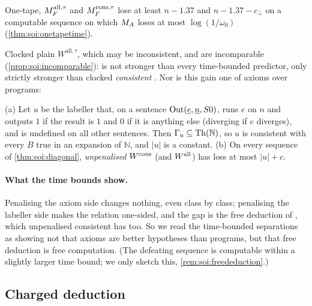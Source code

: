 One-tape, $M_{F}^{\mathrm{all},\tau}$ and $M_{F}^{\mathrm{cons},\tau}$ lose at least $n-1.37$ and $n-1.37-c_\bot$ on a computable sequence on which $M_{A}$ loses at most $\log(1/\omega_0)$ (\cref{thm:soi:onetapetime}).

Clocked plain $W^{\mathrm{all},\tau}$, which may be inconsistent, and \SAIabbr are incomparable (\cref{prop:soi:incomparable}): \SAIabbr is not stronger than every time-bounded predictor, only strictly stronger than clocked \emph{consistent} \SOIabbr. Nor is this gain one of axioms over programs:

\begin{proposition}\label{prop:soi:freededuction}
(a) Let $u$ be the labeller that, on a sentence $\mathrm{Out}(\underline{e},\underline{n},S0)$, runs $e$ on $n$ and outputs $1$ if the result is $1$ and $0$ if it is anything else (diverging if $e$ diverges), and is undefined on all other sentences. Then $\Gamma_u\subseteq\mathrm{Th}(\mathbb N)$, so $u$ is consistent with every $B$ true in an expansion of $\mathbb N$, and $\lvert u\rvert$ is a constant.
(b) On every sequence of \cref{thm:soi:diagonal}, \emph{unpenalised} $W^{\mathrm{cons}}$ (and $W^{\mathrm{all}}$) has loss at most $\lvert u\rvert+c$.
\end{proposition}

\paragraph{What the time bounds show.}\label{rem:soi:timereading} Penalising the axiom side changes nothing, even class by class; penalising the labeller side makes the relation one-sided, and the gap is the free deduction of \SAIabbr, which unpenalised consistent \SOIabbr has too. So we read the time-bounded separations as showing not that axioms are better hypotheses than programs, but that free deduction is free computation. (The defeating sequence is computable within a slightly larger time bound; we only sketch this, \cref{rem:soi:freededuction}.)

\subsection{Charged deduction}\label{sec:soi:charged}

